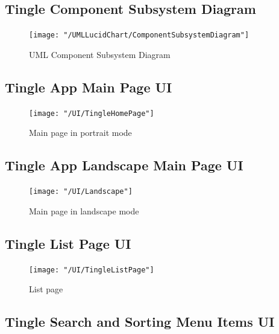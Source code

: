 \documentclass{article} %
\begin{document}
\newpage

\subsection{Tingle Component Subsystem Diagram} \label{App:AppendixA5}

\begin{figure}[h!]
	\centering
	\texttt{[image: "/UMLLucidChart/ComponentSubsystemDiagram"]}
	\caption{UML Component Subsystem Diagram}
	\label{fig:componentsubsystemdiagram}
\end{figure}

\newpage


\subsection{Tingle App Main Page UI} \label{App:AppendixA6}

\begin{figure}[h!]
	\centering
	\texttt{[image: "/UI/TingleHomePage"]}
	\caption{Main page in portrait mode}
	\label{fig:mainpageportrait}
\end{figure}

\newpage

\subsection{Tingle App Landscape Main Page UI} \label{App:AppendixA7}

\begin{figure}[h!]
	\centering
	\texttt{[image: "/UI/Landscape"]}
	\caption{Main page in landscape mode}
	\label{fig:mainpagelandscape}
\end{figure}

\newpage

\subsection{Tingle List Page UI} \label{App:AppendixA8}

\begin{figure}[h!]
	\centering
	\texttt{[image: "/UI/TingleListPage"]}
	\caption{List page}
	\label{fig:listpage}
\end{figure}

\newpage

\subsection{Tingle Search and Sorting Menu Items UI} \label{App:AppendixA9}
\end{document}
